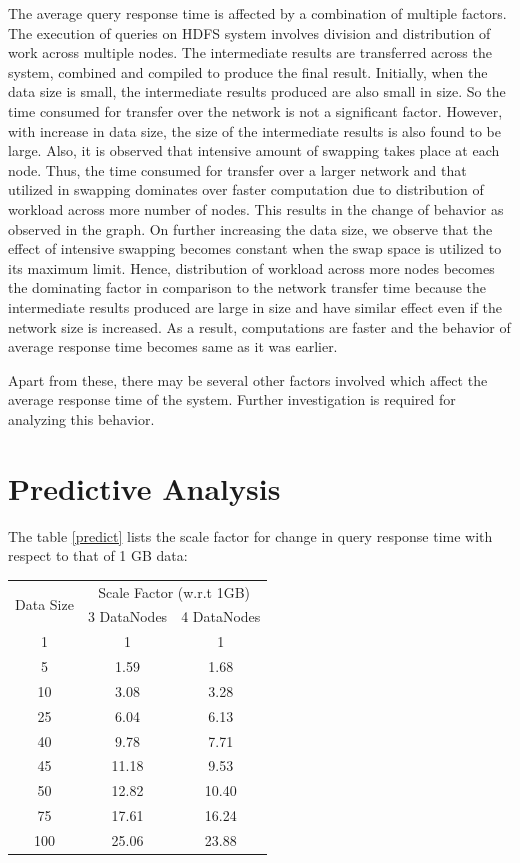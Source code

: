 \documentclass[12pt]{book}
\begin{document}
The average query response time is affected by a combination of multiple factors. The execution of queries on HDFS system involves division
and distribution of work across multiple nodes. The intermediate results are transferred across the system, combined and compiled to produce
the final result. Initially, when the data size is small, the intermediate results produced are also small in size. So the time consumed for 
transfer over the network is not a significant factor. However, with increase in data size, the size of the intermediate results is also found 
to be large. Also, it is observed that intensive amount of swapping takes place at each node. Thus, the time consumed for transfer over a larger 
network and that utilized in swapping dominates over faster computation due to distribution of workload across more number of nodes. This 
results in the change of behavior as observed in the graph. On further increasing the data size, we observe that the effect of intensive
swapping becomes constant when the swap space is utilized to its maximum limit. Hence, distribution of workload across more nodes becomes the 
dominating factor in comparison to the network transfer time because the intermediate results produced are large in size and have similar 
effect even if the network size is increased. As a result, computations are faster and the behavior of average response time becomes same as 
it was earlier.     

Apart from these, there may be several other factors involved which affect the average response time of the system. Further investigation
is required for analyzing this behavior.

\section{Predictive Analysis}
The table \ref{predict} lists the scale factor for change in query response time with respect to that of 1 GB data:
\begin{center}\label{predict}
\begin{tabular}{|c|c|c|}\hline
\multirow{2}{*}{Data Size} & \multicolumn{2}{c|}{Scale Factor (w.r.t 1GB)}\\
\cline{2-3}
& 3 DataNodes & 4 DataNodes\\\hline
1 & 1 & 1\\
5 &  1.59 & 1.68\\
10 & 3.08 & 3.28\\
25 & 6.04 & 6.13\\
40 & 9.78 & 7.71\\
45 & 11.18 & 9.53\\
50 & 12.82 & 10.40\\
75 & 17.61 & 16.24\\
100 & 25.06 & 23.88\\\hline
\end{tabular}
\end{center}
\end{document}
